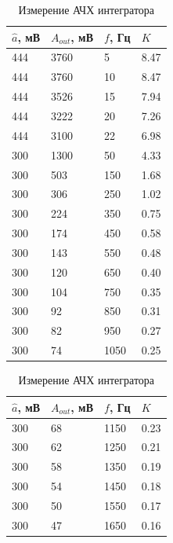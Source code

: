 \documentclass[a4paper,12pt]{article}
\begin{document}
\begin{table}[h]
    \centering
    \caption{Измерение АЧХ интегратора}
    \begin{minipage}[t]{0.48\textwidth}
        \centering
        \begin{tabular}{l|l|l|l}
            \hline
            $\hat{a}$, мВ & $A_\textit{out}$, мВ & $f$, Гц & $K$ \\ \hline
            444 & 3760 & 5    & 8.47 \\
            444 & 3760 & 10   & 8.47 \\
            444 & 3526 & 15   & 7.94 \\
            444 & 3222 & 20   & 7.26 \\
            444 & 3100 & 22   & 6.98 \\
            300 & 1300 & 50   & 4.33 \\
            300 & 503  & 150  & 1.68 \\
            300 & 306  & 250  & 1.02 \\
            300 & 224  & 350  & 0.75 \\
            300 & 174  & 450  & 0.58 \\
            300 & 143  & 550  & 0.48 \\
            300 & 120  & 650  & 0.40 \\
            300 & 104  & 750  & 0.35 \\
            300 & 92   & 850  & 0.31 \\
            300 & 82   & 950  & 0.27 \\
            300 & 74   & 1050 & 0.25 \\ \hline
        \end{tabular}
    \end{minipage}
    \hfill
    \begin{minipage}[t]{0.48\textwidth}
        \centering
        \begin{tabular}{l|l|l|l}
            \hline
            $\hat{a}$, мВ & $A_\textit{out}$, мВ & $f$, Гц & $K$ \\ \hline
            300 & 68   & 1150 & 0.23 \\
            300 & 62   & 1250 & 0.21 \\
            300 & 58   & 1350 & 0.19 \\
            300 & 54   & 1450 & 0.18 \\
            300 & 50   & 1550 & 0.17 \\
            300 & 47   & 1650 & 0.16 \\

\end{tabular}
\end{minipage}
\end{table}
\end{document}
